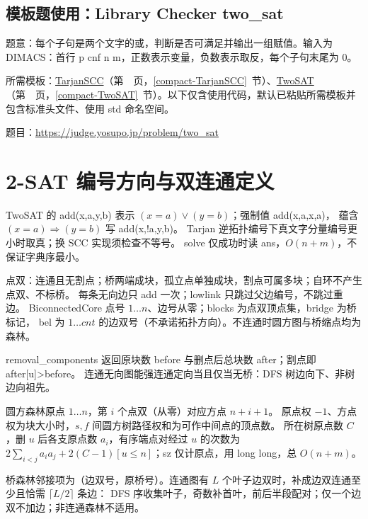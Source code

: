 \subsection*{模板题使用：Library Checker two\_sat}

\label{usage-example-3}

题意：每个子句是两个文字的或，判断是否可满足并输出一组赋值。输入为 DIMACS：首行 p cnf n m，正数表示变量，负数表示取反，每个子句末尾为 0。

所需模板：\hyperref[compact-TarjanSCC]{TarjanSCC}（第~\pageref{compact-TarjanSCC}~页，\ref{compact-TarjanSCC}~节）、\hyperref[compact-TwoSAT]{TwoSAT}（第~\pageref{compact-TwoSAT}~页，\ref{compact-TwoSAT}~节）。以下仅含使用代码，默认已粘贴所需模板并包含标准头文件、使用 std 命名空间。

题目：\url{https://judge.yosupo.jp/problem/two_sat}



\section{2-SAT 编号方向与双连通定义}\label{knowledge-twosat-bcc}
TwoSAT 的 add(x,a,y,b) 表示 $(x=a)\lor(y=b)$；强制值 add(x,a,x,a)，
蕴含 $(x=a)\Rightarrow(y=b)$ 写 add(x,!a,y,b)。
Tarjan 逆拓扑编号下真文字分量编号更小时取真；换 SCC 实现须检查不等号。
solve 仅成功时读 ans，$O(n+m)$，不保证字典序最小。

点双：连通且无割点；桥两端成块，孤立点单独成块，割点可属多块；自环不产生点双、不标桥。
每条无向边只 add 一次；lowlink 只跳过父边编号，不跳过重边。
BiconnectedCore 点号 $1\ldots n$、边号从零；blocks 为点双顶点集，bridge 为桥标记，
bel 为 $1\ldots cnt$ 的边双号（不承诺拓扑方向）。不连通时圆方图与桥缩点均为森林。

removal\_components 返回原块数 before 与删点后总块数 after；割点即 after[u]>before。
连通无向图能强连通定向当且仅当无桥：DFS 树边向下、非树边向祖先。

圆方森林原点 $1\ldots n$，第 $i$ 个点双（从零）对应方点 $n+i+1$。
原点权 $-1$、方点权为块大小时，$s,f$ 间圆方树路径权和为可作中间点的顶点数。
所在树原点数 $C$，删 $u$ 后各支原点数 $a_i$，有序端点对经过 $u$ 的次数为
$2\sum_{i<j}a_i a_j+2(C-1)[u\le n]$；sz 仅计原点，用 long long，总 $O(n+m)$。

桥森林邻接项为（边双号，原桥号）。连通图有 $L$ 个叶子边双时，补成边双连通至少且恰需 $\lceil L/2\rceil$ 条边：
DFS 序收集叶子，奇数补首叶，前后半段配对；仅一个边双不加边；非连通森林不适用。


